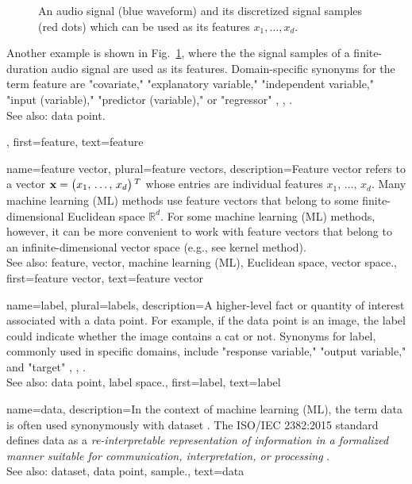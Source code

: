{{{\begin{figure}
		\caption{An audio signal (blue waveform) and its discretized signal samples (red dots) which 
		can be used as its features $x_{1},\ldots,x_{d}$. \label{fig:audio_features_dict}}
		\end{figure}
		Another example is shown in Fig.\ \ref{fig:audio_features_dict}, where the the signal 
		samples of a finite-duration audio signal are used as its features.
		Domain-specific synonyms for the term feature are "covariate," "explanatory variable," 
		"independent variable," "input (variable)," "predictor (variable)," or "regressor" \cite{Gujarati2021}, \cite{Dodge2003}, \cite{Everitt2010}. 
				\\
		See also: data point.}, 
	first={feature},
	text={feature}  
}

{name={feature vector}, plural={feature vectors},
	description={Feature vector refers to a vector ${\bf x} = \big(x_{1}, \,\ldots, \,x_{d}\big)\,^{T}$ 
		whose entries are individual features $x_{1}, \,\ldots, \,x_{d}$. Many machine learning (ML) methods 
		use feature vectors that belong to some finite-dimensional Euclidean space $\mathbb{R}^{d}$. 
		For some machine learning (ML) methods, however, it can be more convenient to work with feature 
		vectors that belong to an infinite-dimensional vector space (e.g., see kernel method). 
			\\
		See also: feature, vector, machine learning (ML), Euclidean space, vector space.}, 
	first={feature vector},
	text={feature vector}  
}


{name={label}, plural={labels},
	description={A higher-level fact or quantity of interest associated 
	with a data point. For example, if the data point is an image, the label 
	could indicate whether the image contains a cat or not. Synonyms for label, commonly 
	used in specific domains, include "response variable," "output variable," and "target" \cite{Gujarati2021}, \cite{Dodge2003}, \cite{Everitt2010}.
				\\
		See also: data point, label space.},
	first={label},
	text={label}  
}


{name={data},
 description={In the context of machine learning (ML), the term 
 data is often used synonymously with dataset
  \cite{Everitt2010,OxfordStatisticsDictionary}. 
  The ISO/IEC 2382:2015 standard defines data as a \emph{re-interpretable representation of 
  information in a formalized manner suitable for communication, interpretation, 
  or processing} \cite{ISO2382}. 
  \\
  See also: dataset, data point, sample.}, 
  text={data}
}
		
}
